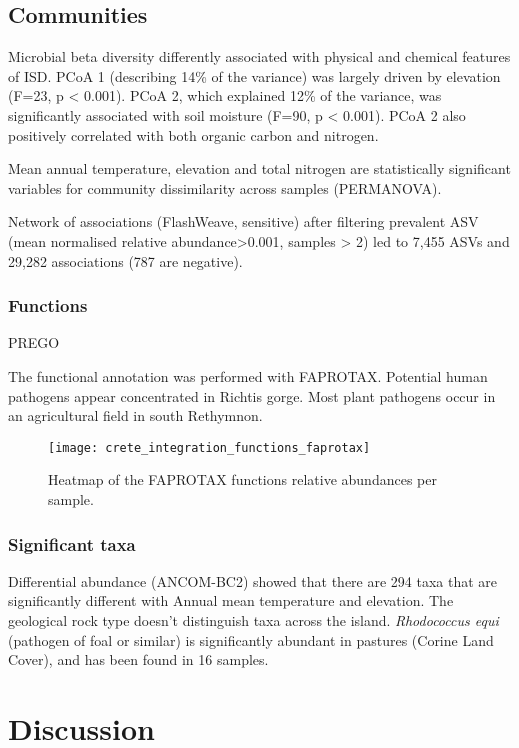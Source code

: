 \subsection{Communities}\label{communities}
Microbial beta diversity differently associated with physical and chemical
features of ISD. PCoA 1 (describing 14\% of the variance) was largely driven by
elevation (F=23, p < 0.001). PCoA 2, which explained 12\% of the variance,
was significantly associated with soil moisture (F=90, p < 0.001).
PCoA 2 also positively correlated with both organic carbon and nitrogen.

Mean annual temperature, elevation and total nitrogen are statistically significant variables for
community dissimilarity across samples (PERMANOVA).

Network of associations (FlashWeave, sensitive) after filtering prevalent ASV (mean normalised relative
abundance>0.001, samples > 2) led to 7,455 ASVs and
29,282 associations (787 are negative).

\subsubsection{Functions}\label{functions}
PREGO


The functional annotation was performed with FAPROTAX. Potential human pathogens 
appear concentrated in Richtis gorge. Most plant pathogens occur in an agricultural 
field in south Rethymnon. 

\begin{figure}[t] 
    \centering\texttt{[image: crete\_integration\_functions\_faprotax]}
\caption{Heatmap of the FAPROTAX functions relative abundances per sample.}
    \label{fig:isd_functions_faprotax}
\end{figure}

\subsubsection{Significant taxa}\label{sig_taxa}
Differential abundance (ANCOM-BC2) showed that there are 294 taxa that are significantly different
with Annual mean temperature and elevation. The geological rock type doesn't distinguish taxa
across the island. \textit{Rhodococcus equi} (pathogen of foal or similar) is significantly abundant in
pastures (Corine Land Cover), and has been found in 16 samples.

\section{Discussion}\label{integration_discussion}


